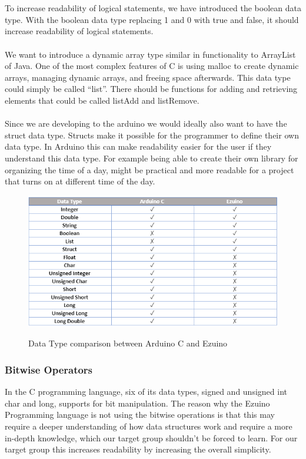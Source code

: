 \\\\
To increase readability of logical statements, we have introduced the boolean data type. With the boolean data type replacing 1 and 0 with true and false, it should increase readability of logical statements.
\\ \\
We want to introduce a dynamic array type similar in functionality to ArrayList of Java. One of the most complex features of C is using malloc to create dynamic arrays, managing dynamic arrays, and freeing space afterwards. This data type could simply be called “list”. There should be functions for adding and retrieving elements that could be called listAdd and listRemove.
\\ \\
Since we are developing to the arduino we would ideally also want to have the struct data type. Structs make it possible for the programmer to define their own data type. In Arduino this can make readability easier for the user if they understand this data type. For example being able to create their own library for organizing the time of a day, might be practical and more readable for a project that turns on at different time of the day.  
\begin{figure}[H]
\centering
\caption{Data Type comparison between Arduino C and Ezuino}
\includegraphics[scale=0.85]{figures/language_features/langf01.png}
\label{lf01}
\end{figure}
\subsubsection*{Bitwise Operators}
In the C programming language, six of its data types, signed and unsigned int char and long, supports for bit manipulation. %
The reason why the Ezuino Programming language is not using the bitwise operations is that this may require a deeper understanding of how data structures work and require a more in-depth knowledge, which our target group shouldn’t be forced to learn. For our target group this increases readability by increasing the overall simplicity.
